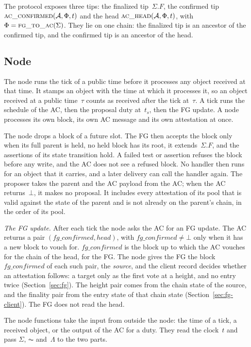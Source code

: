The protocol exposes three tips: the finalized tip~$\Sigma.F$, the
confirmed tip $\Call{ac\_confirmed}{\AC,\Fr,t}$ and the head
$\Call{ac\_head}{\AC,\Fr,t}$, with $\Fr=\Call{fg\_to\_ac}{\Sigma}$.  They
lie on one chain: the finalized tip is an ancestor of the confirmed tip,
and the confirmed tip is an ancestor of the head.

\subsection{Node}\label{sec:node}

The node runs the tick of a public time before it processes any object
received at that time.  It stamps an object with the time at which it
processes it, so an object received at a public time~$\tau$ counts as
received after the tick at~$\tau$.  A tick runs the schedule of the AC,
then the proposal duty at~$t_s$,
then the FG update.  A node processes its own block, its own AC
message and its own attestation at once.

The node drops a block of a future slot.  The FG then accepts the block
only when its full parent is held, no held block has its root, it
extends~$\Sigma.F$, and the assertions of its state transition hold.  A
failed test or assertion refuses the block before any write, and the AC
does not see a refused block.
No handler then runs for an object that it carries, and a later delivery
can call the handler again.  The proposer takes the parent and the AC
payload from the AC; when the AC returns~$\bot$, it makes no proposal.  It includes every attestation of its pool that is
valid against the state of the parent and is not already on the parent's
chain, in the order of its pool.

\emph{The FG update.}  After each tick the node asks the AC for an FG
update.  The AC returns a pair $(\mathit{fg\_confirmed},\mathit{head})$, with
$\mathit{fg\_confirmed}\neq\bot$ only when it has a new block to vouch
for.
$\mathit{fg\_confirmed}$ is the block up to which the AC vouches for the
chain of the head, for the FG.  The node gives the FG the block
$\mathit{fg\_confirmed}$ of each such pair, the \emph{source}, and the
client record decides whether an attestation follows: a target only as the
first vote at a height, and no entry twice (Section~\ref{sec:fg}).  The
height pair comes from the chain state of the source, and the finality
pair from the entry state of that chain state
(Section~\ref{sec:fg-client}).  The FG does not read the head.

The node functions take the input from outside the node: the time of a
tick, a received object, or the output of the AC for a duty.  They read
the clock~$t$ and pass $\Sigma$, $\AC$ and~$\Lambda$ to the two parts.


